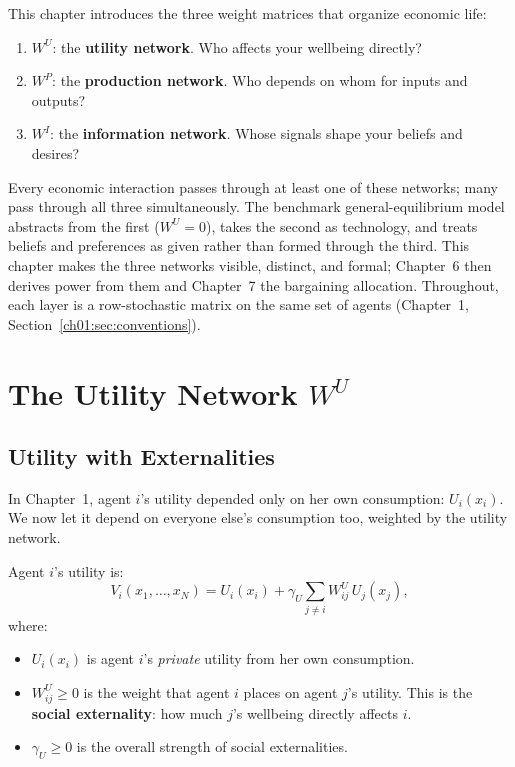 \documentclass[../structural_economics_book.tex]{subfiles}
\begin{document}
This chapter introduces the three weight matrices that organize economic life:

\begin{enumerate}
\item $W^U$: the \textbf{utility network}. Who affects your wellbeing directly?
\item $W^P$: the \textbf{production network}. Who depends on whom for inputs and outputs?
\item $W^I$: the \textbf{information network}. Whose signals shape your beliefs and desires?
\end{enumerate}

Every economic interaction passes through at least one of these networks; many pass through all three simultaneously. The benchmark general-equilibrium model abstracts from the first ($W^U = 0$), takes the second as technology, and treats beliefs and preferences as given rather than formed through the third. This chapter makes the three networks visible, distinct, and formal; Chapter~6 then derives power from them and Chapter~7 the bargaining allocation. Throughout, each layer is a row-stochastic matrix on the same set of agents (Chapter~1, Section~\ref{ch01:sec:conventions}).

\section{The Utility Network $W^U$}
\label{ch05:sec:WU}

\subsection{Utility with Externalities}

In Chapter~1, agent $i$'s utility depended only on her own consumption: $U_i(x_i)$. We now let it depend on everyone else's consumption too, weighted by the utility network.

\begin{definition}\label{ch05:def:utility_WU}
Agent $i$'s utility is:
\begin{equation}\label{ch05:eq:utility_WU}
V_i(x_1, \ldots, x_N) = U_i(x_i) + \gamma_U \sum_{j \neq i} W^U_{ij} \, U_j(x_j),
\end{equation}
where:
\begin{itemize}
\item $U_i(x_i)$ is agent $i$'s \textit{private} utility from her own consumption.
\item $W^U_{ij} \geq 0$ is the weight that agent $i$ places on agent $j$'s utility. This is the \textbf{social externality}: how much $j$'s wellbeing directly affects $i$.
\item $\gamma_U \geq 0$ is the overall strength of social externalities.
\end{itemize}
\end{definition}
\end{document}
